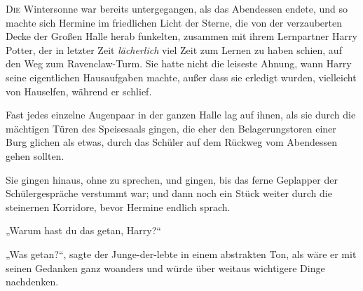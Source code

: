 
\lettrine{D}{ie} Wintersonne war bereits untergegangen, als das Abendessen endete, und so machte sich Hermine im friedlichen Licht der Sterne, die von der verzauberten Decke der Großen Halle herab funkelten, zusammen mit ihrem Lernpartner Harry Potter, der in letzter Zeit \emph{lächerlich} viel Zeit zum Lernen zu haben schien, auf den Weg zum Ravenclaw-Turm. Sie hatte nicht die leiseste Ahnung, wann Harry seine eigentlichen Hausaufgaben machte, außer dass sie erledigt wurden, vielleicht von Hauselfen, während er schlief.

Fast jedes einzelne Augenpaar in der ganzen Halle lag auf ihnen, als sie durch die mächtigen Türen des Speisesaals gingen, die eher den Belagerungstoren einer Burg glichen als etwas, durch das Schüler auf dem Rückweg vom Abendessen gehen sollten.

Sie gingen hinaus, ohne zu sprechen, und gingen, bis das ferne Geplapper der Schülergespräche verstummt war; und dann noch ein Stück weiter durch die steinernen Korridore, bevor Hermine endlich sprach.

„Warum hast du das getan, Harry?“

„Was getan?“, sagte der Junge-der-lebte in einem abstrakten Ton, als wäre er mit seinen Gedanken ganz woanders und würde über weitaus wichtigere Dinge nachdenken.

